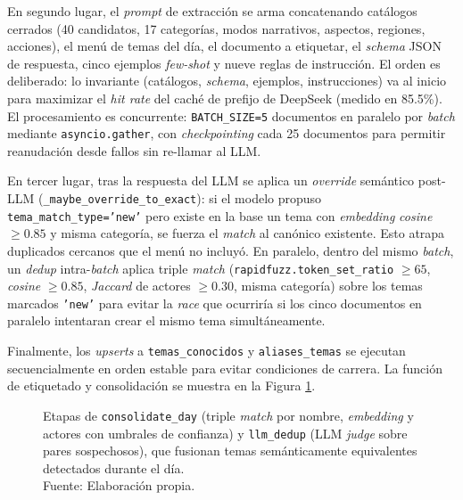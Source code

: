 En segundo lugar, el \textit{prompt} de extracción se arma concatenando catálogos
cerrados (40 candidatos, 17 categorías, modos narrativos, aspectos, regiones,
acciones), el menú de temas del día, el documento a etiquetar, el \textit{schema}
JSON de respuesta, cinco ejemplos \textit{few-shot} y nueve reglas de
instrucción. El orden es deliberado: lo invariante (catálogos, \textit{schema},
ejemplos, instrucciones) va al inicio para maximizar el \textit{hit rate} del
caché de prefijo de DeepSeek (medido en 85.5\%). El procesamiento es concurrente:
\texttt{BATCH\_SIZE=5} documentos en paralelo por \textit{batch} mediante
\texttt{asyncio.gather}, con \textit{checkpointing} cada 25 documentos para
permitir reanudación desde fallos sin re-llamar al LLM.

En tercer lugar, tras la respuesta del LLM se aplica un \textit{override}
semántico post-LLM (\texttt{\_maybe\_override\_to\_exact}): si el modelo propuso
\texttt{tema\_match\_type='new'} pero existe en la base un tema con
\textit{embedding} \textit{cosine} $\geq 0.85$ y misma categoría, se fuerza el
\textit{match} al canónico existente. Esto atrapa duplicados cercanos que el menú
no incluyó. En paralelo, dentro del mismo \textit{batch}, un \textit{dedup}
intra-\textit{batch} aplica triple \textit{match}
(\texttt{rapidfuzz.token\_set\_ratio} $\geq 65$, \textit{cosine} $\geq 0.85$,
\textit{Jaccard} de actores $\geq 0.30$, misma categoría) sobre los temas marcados
\texttt{'new'} para evitar la \textit{race} que ocurriría si los cinco documentos
en paralelo intentaran crear el mismo tema simultáneamente.

Finalmente, los \textit{upserts} a \texttt{temas\_conocidos} y
\texttt{aliases\_temas} se ejecutan secuencialmente en orden estable para evitar
condiciones de carrera. La función de etiquetado y consolidación se muestra en la
Figura \ref{5:fig19}.

\begin{figure}[!ht]
    \begin{center}
        \resizebox{0.85\textwidth}{!}{}
        \caption[Etapa de consolidación y deduplicación de temas]{Etapas de \texttt{consolidate\_day} (triple \textit{match} por nombre, \textit{embedding} y actores con umbrales de confianza) y \texttt{llm\_dedup} (LLM \textit{judge} sobre pares sospechosos), que fusionan temas semánticamente equivalentes detectados durante el día.\\
            Fuente: Elaboración propia.}
        \label{5:fig19}
    \end{center}
\end{figure}

